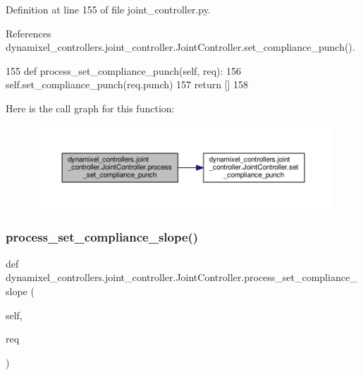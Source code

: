 Definition at line 155 of file joint\+\_\+controller.\+py.



References dynamixel\+\_\+controllers.\+joint\+\_\+controller.\+Joint\+Controller.\+set\+\_\+compliance\+\_\+punch().


\begin{DoxyCode}
155     \textcolor{keyword}{def }process\_set\_compliance\_punch(self, req):
156         self.set\_compliance\_punch(req.punch)
157         \textcolor{keywordflow}{return} []
158 
\end{DoxyCode}
Here is the call graph for this function\+:
\nopagebreak
\begin{figure}[H]
\begin{center}
\leavevmode
\includegraphics[width=350pt]{d3/dcd/classdynamixel__controllers_1_1joint__controller_1_1_joint_controller_ac3d7aea8d47f24ab10c1162f34cce44f_cgraph}
\end{center}
\end{figure}
\mbox{\label{classdynamixel__controllers_1_1joint__controller_1_1_joint_controller_a6390c0c20afc0581dd3b1122c894d175}} 
\subsubsection{\texorpdfstring{process\+\_\+set\+\_\+compliance\+\_\+slope()}{process\_set\_compliance\_slope()}}
{\footnotesize\ttfamily def dynamixel\+\_\+controllers.\+joint\+\_\+controller.\+Joint\+Controller.\+process\+\_\+set\+\_\+compliance\+\_\+slope (\begin{DoxyParamCaption}\item[{}]{self,  }\item[{}]{req }\end{DoxyParamCaption})\hspace{0.3cm}{\ttfamily [inherited]}}



